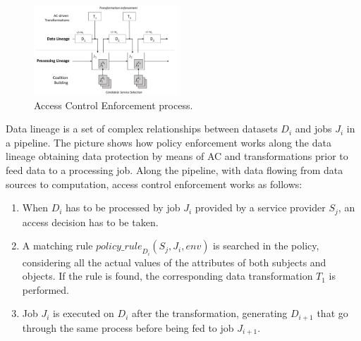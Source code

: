 \begin{figure}[!t]
	\centering
	\includegraphics[width=0.48\textwidth]{meth.pdf}
\caption{Access Control Enforcement process.}
	\label{fig:smet}
\end{figure} 


Data lineage is a set of complex relationships between datasets $D_i$ and jobs $J_i$ in a pipeline.  The picture shows how policy enforcement works along the data lineage obtaining data protection by means of AC and transformations prior to feed data to a processing job.
Along the pipeline, with data flowing from data sources to computation, access control enforcement works as follows:
\begin{enumerate}
\item When $D_i$ has to be processed by job $J_i$ provided by a service provider $S_j$, an access decision has to be taken.
\item A matching rule $\textit{policy\_rule}_{D_i}(S_j,J_i,\textit{env})$ is searched in the policy, considering all the actual values of the attributes of both subjects and objects. If the rule is found, the corresponding data transformation $T_1$ is performed.
\item Job $J_i$ is executed on $D_i$ after the transformation, generating $D_{i+1}$ that go through the same process before being fed to job $J_{i+1}$.
\end{enumerate}


